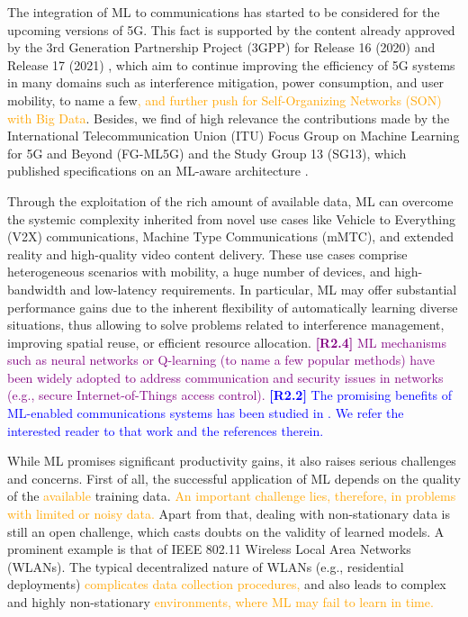 \documentclass[journal]{IEEEtran}
\begin{document}
	The integration of ML to communications has started to be considered for the upcoming versions of 5G. This fact is supported by the content already approved by the 3rd Generation Partnership Project (3GPP) for Release 16 (2020) and Release 17 (2021) \cite{3gpp2019study}, which aim to continue improving the efficiency of 5G systems in many domains such as interference mitigation, power consumption, and user mobility, to name a few\textcolor{orange}{, and further push for Self-Organizing Networks (SON) with Big Data}. Besides, we find of high relevance the contributions made by the International Telecommunication Union (ITU) Focus Group on Machine Learning for 5G and Beyond (FG-ML5G) and the Study Group 13 (SG13), which published specifications on an ML-aware architecture \cite{ITU3172, ITU3174}.
	
	Through the exploitation of the rich amount of available data, ML can overcome the systemic complexity inherited from novel use cases like Vehicle to Everything (V2X) communications, Machine Type Communications (mMTC), and extended reality and high-quality video content delivery. These use cases comprise heterogeneous scenarios with mobility, a huge number of devices, and high-bandwidth and low-latency requirements. In particular, ML may offer substantial performance gains due to the inherent flexibility of automatically learning diverse situations, thus allowing to solve problems related to interference management, improving spatial reuse, or efficient resource allocation. \textcolor{purple}{\textbf{[R2.4]} ML mechanisms such as neural networks or Q-learning (to name a few popular methods) have been widely adopted to address communication and security issues in networks (e.g., secure Internet-of-Things access control).} \textcolor{blue}{\textbf{[R2.2]} The promising benefits of ML-enabled communications systems has been studied in \cite{itu_architecture}. We refer the interested reader to that work and the references therein.}
	
	While ML promises significant productivity gains, it also raises serious challenges and concerns. First of all, the successful application of ML depends on the quality of the \textcolor{orange}{available} training data. \textcolor{orange}{An important challenge lies, therefore, in problems with limited or noisy data.} Apart from that, dealing with non-stationary data is still an open challenge, which casts doubts on the validity of learned models. A prominent example is that of IEEE 802.11 Wireless Local Area Networks (WLANs). The typical decentralized nature of WLANs (e.g., residential deployments) \textcolor{orange}{complicates data collection procedures, }and also leads to complex and highly non-stationary \textcolor{orange}{environments, where ML may fail to learn in time.}
	
\end{document}
